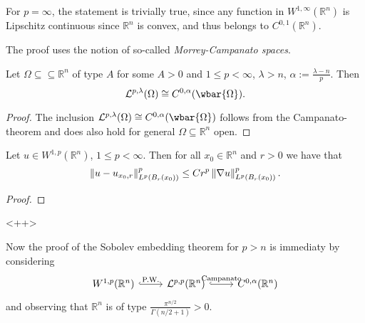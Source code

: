 \begin{remark}
	For $p = \infty$, the statement is trivially true, since any function in $W^{1,\infty}(\mathbb{R}^n)$ is Lipschitz continuous since $\mathbb{R}^n$ is convex, and thus belongs to $C^{0,1}(\mathbb{R}^n)$.
\end{remark}

The proof uses the notion of so-called \emph{Morrey-Campanato spaces}. 

\begin{theorem}
	Let $\Omega \subseteq \subseteq \mathbb{R}^n$ of type $A$ for some $A > 0$ and $1 \leq p < \infty$, $\lambda > n$, $\alpha := \frac{\lambda - n}{p}$. Then
	\begin{equation*}
		\mathcal{L}^{p,\lambda}(\Omega) \cong C^{0,\alpha}(\wbar{\Omega}).
	\end{equation*}
\end{theorem}

\begin{proof}
	The inclusion $\mathcal{L}^{p,\lambda}(\Omega) \cong C^{0,\alpha}(\wbar{\Omega})$ follows from the Campanato-theorem and does also hold for general $\Omega \subseteq \mathbb{R}^n$ open.
\end{proof}

\begin{theorem}
	Let $u \in W^{1,p}(\mathbb{R}^n)$, $1 \leq p < \infty$. Then for all $x_0 \in \mathbb{R}^n$ and $r > 0$ we have that
	\begin{equation*}
		\norm[0]{u - u_{x_0,r}}_{L^p(B_r(x_0))}^p \leq Cr^p \norm[0]{\nabla u}^p_{L^p(B_r(x_0))}.
	\end{equation*}
\end{theorem}

\begin{proof}
	
\end{proof}<++>

Now the proof of the Sobolev embedding theorem for $p > n$ is immediaty by considering
\begin{equation*}
	\begin{tikzcd}
		W^{1,p}(\mathbb{R}^n) \arrow[r,"\text{P.W.}",hook] & \mathcal{L}^{p,p}(\mathbb{R}^n) \arrow[r,"\text{Campanato}",hook] & C^{0,\alpha}(\mathbb{R}^n)
	\end{tikzcd}
\end{equation*}
\noindent and observing that $\mathbb{R}^n$ is of type $\frac{\pi^{n/2}}{\Gamma(n/2 + 1)} > 0$.

\printbibliography

